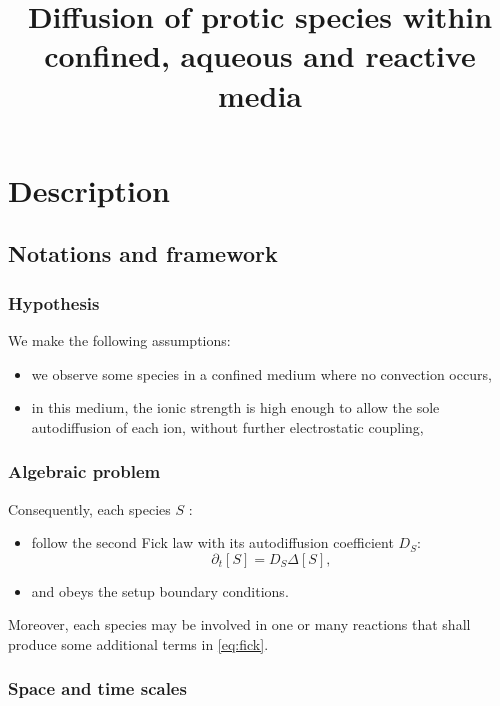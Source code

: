 \documentclass[aps,12pt]{revtex4}
\begin{document}
\title{Diffusion of protic species within confined, aqueous and reactive media}
\maketitle
	
\section{Description}	

\subsection{Notations and framework}
 
\subsubsection{Hypothesis}
We make the following assumptions:
\begin{itemize}
\item we observe some species in a confined medium where no convection occurs,
\item in this medium, the ionic strength is high enough to allow the sole autodiffusion of each ion, without further electrostatic coupling,
\end{itemize}


\subsubsection{Algebraic problem}
Consequently, each species $S$ :
\begin{itemize}
\item follow the second Fick law with its autodiffusion coefficient $D_S$:
\begin{equation}
\label{eq:fick}
	\partial_t [S] = D_S \Delta [S],
\end{equation}

\item and obeys the setup boundary conditions.
\end{itemize}

Moreover, each species may be involved in one or many reactions that shall produce some additional terms in \eqref{eq:fick}.

\subsubsection{Space and time scales}
\end{document}
